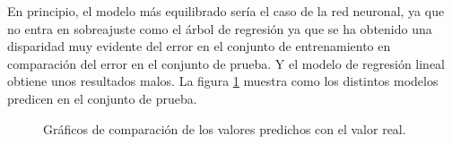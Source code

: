\noindent En principio, el modelo más equilibrado sería el caso de la red neuronal, ya que no entra en sobreajuste como el árbol de regresión ya que se ha obtenido una disparidad muy evidente del error en el conjunto de entrenamiento en comparación del error en el conjunto de prueba. Y el modelo de regresión lineal obtiene unos resultados malos. La figura \ref{fig: comparación} muestra como los distintos modelos predicen en el conjunto de prueba.

%   
%    
% 
%  
% 

\begin{figure}[h]
 \centering
 \caption{Gráficos de comparación de los valores predichos con el valor real.}
  \label{fig: comparación}
\end{figure}




